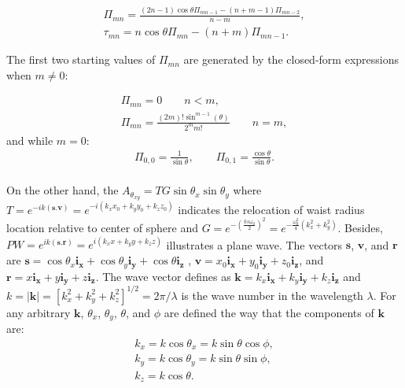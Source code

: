 \documentclass{osa-article}
\begin{document}
\begin{appendices}
\begin{equation}\label{eq3_a}
\begin{gathered}
\Pi_{mn}=\frac{(2n-1)\cos\theta\Pi_{mn-1}-(n+m-1)\Pi_{mn-2}}{n-m},\\
\tau_{mn}=n\cos\theta\Pi_{mn}-(n+m)\Pi_{mn-1}.
\end{gathered}
\end{equation}
  
 The first two starting values of $\Pi_{mn}$ are generated by the closed-form expressions when $m\neq0$:
 
\begin{equation}\label{eq4_a}
\begin{gathered}
 \Pi_{mn}=0\qquad n<m,\\ \Pi_{mn}=\frac{(2m)!\sin^{m-1}(\theta)}{2^mm!}\qquad n=m,
\end{gathered}
\end{equation}
and while $m=0$:
 \begin{equation}\label{eq5_a}
 \begin{gathered}
 \Pi_{0,0}=\frac{1}{\sin\theta},\qquad
 \Pi_{0,1}=\frac{\cos\theta}{\sin\theta}.\\
 \end{gathered}
 \end{equation}

On the other hand, the $A_{\theta_{xy}}=TG\sin\theta_x\sin\theta_y$ where $T=e^{-ik(\textbf{s}.\textbf{v})}=e^{-i(k_xx_0+k_yy_0+k_zz_0)}$ indicates the relocation of waist radius location relative to center of sphere and $G=e^{-(\frac{ks\omega_0}{2})^2}=e^{-\frac{\omega^2_0}{4}(k^2_x+k^2_y)}$. Besides, $PW=e^{ik(\textbf{s}.\textbf{r})}=e^{i(k_xx+k_yy+k_zz)}$ illustrates a plane wave. The vectors $\textbf{s}$, $\textbf{v}$, and $\textbf{r}$ are $\textbf{s}=\cos\theta_x\mathbf{i_x}+\cos\theta_y\mathbf{i_y}+\cos\theta\mathbf{i_z}$ , $\textbf{v}=x_0\mathbf{i_x}+y_0\mathbf{i_y}+z_0\mathbf{i_z}$, and $\textbf{r}=x\mathbf{i_x}+y\mathbf{i_y}+z\mathbf{i_z}$. The wave vector defines as $\textbf{k}=k_x\mathbf{i_x}+k_y\mathbf{i_y}+k_z\mathbf{i_z}$ and $k=|\textbf{k}|=[k_x^2+k_y^2+k_z^2]^{1/2}=2\pi/\lambda$ is the wave number in the wavelength $\lambda$. For any arbitrary $\textbf{k}$, $\theta_x$, $\theta_y$, $\theta$, and $\phi$ are defined the way that the components of $\textbf{k}$ are:
\begin{equation}\label{eq6_a}
\begin{gathered}
k_x=k\cos\theta_x=k\sin\theta\cos\phi,\\
k_y=k\cos\theta_y=k\sin\theta\sin\phi,\\
k_z=k\cos\theta.
\end{gathered}
\end{equation}



\end{appendices}
\end{document}
